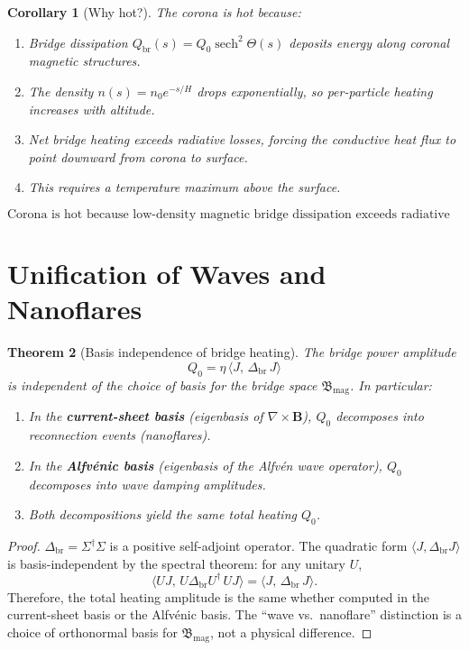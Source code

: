 \documentclass[12pt]{article}
\theoremstyle{plain}
\newtheorem{theorem}{Theorem}[section]
\newtheorem{corollary}[theorem]{Corollary}
\theoremstyle{definition}
\numberwithin{equation}{section}
\newcommand{\br}{\mathrm{br}}
\newcommand{\fB}{\mathfrak{B}}
\DeclareMathOperator{\sech}{sech}
\begin{document}
\begin{corollary}[Why hot?]
The corona is hot because:
\begin{enumerate}[label=(\roman*)]
\item Bridge dissipation $Q_{\br}(s)=Q_0\sech^2\Theta(s)$
deposits energy along coronal magnetic structures.
\item The density $n(s)=n_0 e^{-s/H}$ drops exponentially,
so per-particle heating increases with altitude.
\item Net bridge heating exceeds radiative losses, forcing
the conductive heat flux to point \emph{downward} from corona
to surface.
\item This requires a temperature maximum above the surface.
\end{enumerate}
\begin{equation}
\boxed{\text{Corona is hot because low-density magnetic bridge
dissipation exceeds radiative losses.}}
\end{equation}
\end{corollary}


\section{Unification of Waves and Nanoflares}\label{sec:unification}

\begin{theorem}[Basis independence of bridge heating]\label{thm:basis}
The bridge power amplitude
\begin{equation}
Q_0 = \eta\,\langle J,\,\Delta_{\br}\,J\rangle
\end{equation}
is independent of the choice of basis for the bridge space
$\fB_{\mathrm{mag}}$.  In particular:
\begin{enumerate}[label=(\roman*)]
\item In the \textbf{current-sheet basis} (eigenbasis of
$\nabla\times\mathbf{B}$), $Q_0$ decomposes into reconnection
events (nanoflares).
\item In the \textbf{Alfv\'enic basis} (eigenbasis of the
Alfv\'en wave operator), $Q_0$ decomposes into wave damping
amplitudes.
\item Both decompositions yield the same total heating $Q_0$.
\end{enumerate}
\end{theorem}

\begin{proof}
$\Delta_{\br}=\Sigma^\dagger\Sigma$ is a positive self-adjoint
operator.  The quadratic form
$\langle J,\Delta_{\br}J\rangle$ is basis-independent by the
spectral theorem: for any unitary $U$,
\begin{equation}
\langle UJ,\,U\Delta_{\br}U^\dagger\,UJ\rangle
= \langle J,\,\Delta_{\br}\,J\rangle.
\end{equation}
Therefore, the total heating amplitude is the same whether
computed in the current-sheet basis or the Alfv\'enic basis.
The ``wave vs.\ nanoflare'' distinction is a choice of
orthonormal basis for $\fB_{\mathrm{mag}}$, not a physical
difference.
\end{proof}
\end{document}
